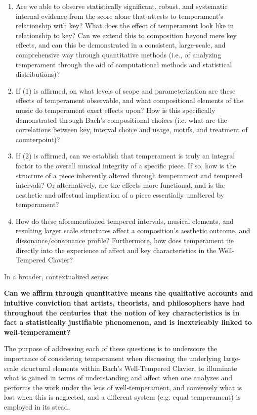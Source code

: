 \begin{enumerate}
\def\labelenumi{\arabic{enumi}.}
\tightlist
\item
  Are we able to observe statistically significant, robust, and
  systematic internal evidence from the score alone that attests to
  temperament's relationship with key? What does the effect of
  temperament look like in relationship to key? Can we extend this to
  composition beyond mere key effects, and can this be demonstrated in a
  consistent, large-scale, and comprehensive way through quantitative
  methods (i.e., of analyzing temperament through the aid of
  computational methods and statistical distributions)?
\item
  If (1) is affirmed, on what levels of scope and parameterization are
  these effects of temperament observable, and what compositional
  elements of the music do temperament exert effects upon? How is this
  specifically demonstrated through Bach's compositional choices (i.e.
  what are the correlations between key, interval choice and usage,
  motifs, and treatment of counterpoint)?
\item
  If (2) is affirmed, can we establish that temperament is truly an
  integral factor to the overall musical integrity of a specific piece.
  If so, how is the structure of a piece inherently altered through
  temperament and tempered intervals? Or alternatively, are the effects
  more functional, and is the aesthetic and affectual implication of a
  piece essentially unaltered by temperament?
\item
  How do these aforementioned tempered intervals, musical elements, and
  resulting larger scale structures affect a composition's aesthetic
  outcome, and dissonance/consonance profile? Furthermore, how does
  temperament tie directly into the experience of affect and key
  characteristics in the Well-Tempered Clavier?
\end{enumerate}

In a broader, contextualized sense:

\textbf{Can we affirm through quantitative means the qualitative
accounts and intuitive conviction that artists, theorists, and
philosophers have had throughout the centuries that the notion of key
characteristics is in fact a statistically justifiable phenomenon, and
is inextricably linked to well-temperament?}

The purpose of addressing each of these questions is to underscore the
importance of considering temperament when discussing the underlying
large-scale structural elements within Bach's Well-Tempered Clavier, to
illuminate what is gained in terms of understanding and affect when one
analyzes and performs the work under the lens of well-temperament, and
conversely what is lost when this is neglected, and a different system
(e.g. equal temperament) is employed in its stead.

